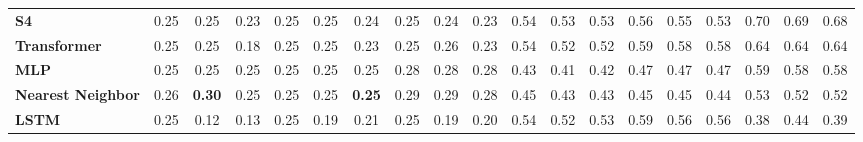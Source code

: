 \begin{table}[t]
{\begin{tabular}{l ccc ccc ccc ccc ccc ccc}
\textbf{S4} & \cellcolor[HTML]{FF6B6B}0.25 & \cellcolor[HTML]{FF6B6B}0.25 & \cellcolor[HTML]{FF6B6B}0.23 & \cellcolor[HTML]{FF6B6B}0.25 & \cellcolor[HTML]{FF6B6B}0.25 & \cellcolor[HTML]{FF6B6B}0.24 & \cellcolor[HTML]{FF6B6B}0.25 & \cellcolor[HTML]{FF6B6B}0.24 & \cellcolor[HTML]{FF6B6B}0.23 & \cellcolor[HTML]{E6D341}0.54 & \cellcolor[HTML]{EDD33F}0.53 & \cellcolor[HTML]{ECD340}0.53 & \cellcolor[HTML]{D8D345}0.56 & \cellcolor[HTML]{DFD343}0.55 & \cellcolor[HTML]{EAD340}0.53 & \cellcolor[HTML]{73D05E}0.70 & \cellcolor[HTML]{79D05C}0.69 & \cellcolor[HTML]{82D05A}0.68 \\
\textbf{Transformer} & \cellcolor[HTML]{FF6B6B}0.25 & \cellcolor[HTML]{FF6B6B}0.25 & \cellcolor[HTML]{FF6B6B}0.18 & \cellcolor[HTML]{FF6B6B}0.25 & \cellcolor[HTML]{FF6B6B}0.25 & \cellcolor[HTML]{FF6B6B}0.23 & \cellcolor[HTML]{FF6C6B}0.25 & \cellcolor[HTML]{FF6E6A}0.26 & \cellcolor[HTML]{FF6B6B}0.23 & \cellcolor[HTML]{E6D341}0.54 & \cellcolor[HTML]{F2D43E}0.52 & \cellcolor[HTML]{EED43F}0.52 & \cellcolor[HTML]{C1D24A}0.59 & \cellcolor[HTML]{C6D249}0.58 & \cellcolor[HTML]{CAD248}0.58 & \cellcolor[HTML]{9ED153}0.64 & \cellcolor[HTML]{9FD153}0.64 & \cellcolor[HTML]{A0D152}0.64 \\
\textbf{MLP} & \cellcolor[HTML]{FF6B6B}0.25 & \cellcolor[HTML]{FF6B6B}0.25 & \cellcolor[HTML]{FF6B6B}0.25 & \cellcolor[HTML]{FF6B6B}0.25 & \cellcolor[HTML]{FF6B6B}0.25 & \cellcolor[HTML]{FF6B6B}0.25 & \cellcolor[HTML]{FF7766}0.28 & \cellcolor[HTML]{FF7765}0.28 & \cellcolor[HTML]{FF7666}0.28 & \cellcolor[HTML]{FFB549}0.43 & \cellcolor[HTML]{FFAE4C}0.41 & \cellcolor[HTML]{FFB14B}0.42 & \cellcolor[HTML]{FFC641}0.47 & \cellcolor[HTML]{FFC741}0.47 & \cellcolor[HTML]{FFC641}0.47 & \cellcolor[HTML]{C3D24A}0.59 & \cellcolor[HTML]{C7D249}0.58 & \cellcolor[HTML]{C6D249}0.58 \\
\textbf{Nearest Neighbor} & \cellcolor[HTML]{FF7168}0.26 & \cellcolor[HTML]{FF7E62}\textbf{0.30} & \cellcolor[HTML]{FF6B6B}0.25 & \cellcolor[HTML]{FF6C6A}0.25 & \cellcolor[HTML]{FF6C6A}0.25 & \cellcolor[HTML]{FF6B6B}\textbf{0.25} & \cellcolor[HTML]{FF7D63}0.29 & \cellcolor[HTML]{FF7B64}0.29 & \cellcolor[HTML]{FF7666}0.28 & \cellcolor[HTML]{FFBE45}0.45 & \cellcolor[HTML]{FFB649}0.43 & \cellcolor[HTML]{FFB948}0.43 & \cellcolor[HTML]{FFC044}0.45 & \cellcolor[HTML]{FFBD45}0.45 & \cellcolor[HTML]{FFBD46}0.44 & \cellcolor[HTML]{EAD340}0.53 & \cellcolor[HTML]{F2D43E}0.52 & \cellcolor[HTML]{F1D43E}0.52 \\
\textbf{LSTM} & \cellcolor[HTML]{FF6B6B}0.25 & \cellcolor[HTML]{FF6B6B}0.12 & \cellcolor[HTML]{FF6B6B}0.13 & \cellcolor[HTML]{FF6B6B}0.25 & \cellcolor[HTML]{FF6B6B}0.19 & \cellcolor[HTML]{FF6B6B}0.21 & \cellcolor[HTML]{FF6B6B}0.25 & \cellcolor[HTML]{FF6B6B}0.19 & \cellcolor[HTML]{FF6B6B}0.20 & \cellcolor[HTML]{E3D342}0.54 & \cellcolor[HTML]{F0D43F}0.52 & \cellcolor[HTML]{EBD340}0.53 & \cellcolor[HTML]{BED24B}0.59 & \cellcolor[HTML]{D2D346}0.56 & \cellcolor[HTML]{D5D345}0.56 & \cellcolor[HTML]{FFA351}0.38 & \cellcolor[HTML]{FFBA47}0.44 & \cellcolor[HTML]{FFA650}0.39 \\

\end{tabular}}
\end{table}
